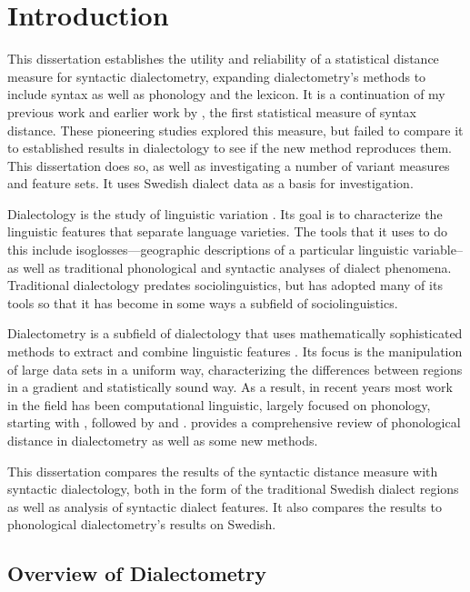 \chapter{Introduction}

This dissertation establishes the utility and reliability of a
statistical distance measure for syntactic dialectometry, expanding
dialectometry's methods to include syntax as well as phonology and the
lexicon. It is a continuation of my previous work \cite{sanders07,sanders08b} and earlier work by , the first
statistical measure of syntax distance. These pioneering studies
explored this measure, but failed to compare it to established results
in dialectology to see if the new method reproduces them. This
dissertation does so, as well as investigating a number of variant
measures and feature sets. It uses Swedish dialect data as a basis for
investigation.

Dialectology is the study of linguistic variation \cite{chambers98}.
Its goal is to characterize the linguistic features that separate
language varieties. The tools that it uses to do this include
isoglosses---geographic descriptions of a particular linguistic
variable--as well as traditional phonological and syntactic analyses
of dialect phenomena. Traditional dialectology predates
sociolinguistics, but has adopted many of its tools so that it has
become in some ways a subfield of sociolinguistics.

Dialectometry is a subfield of dialectology that uses mathematically
sophisticated methods to extract and combine linguistic features
\cite{seguy73}. Its focus is the manipulation of large data sets in a
uniform way, characterizing the differences between regions in a
gradient and statistically sound way. As a result, in recent years most
work in the field has been computational linguistic, largely focused
on phonology, starting with , followed by
 and . 
provides a comprehensive review of phonological distance in
dialectometry as well as some new methods.

This dissertation compares the results of the syntactic distance
measure with syntactic dialectology, both in the form of the traditional
Swedish dialect regions as well as analysis of syntactic dialect
features. It also compares the results to phonological dialectometry's
results on Swedish.

\section{Overview of Dialectometry}

